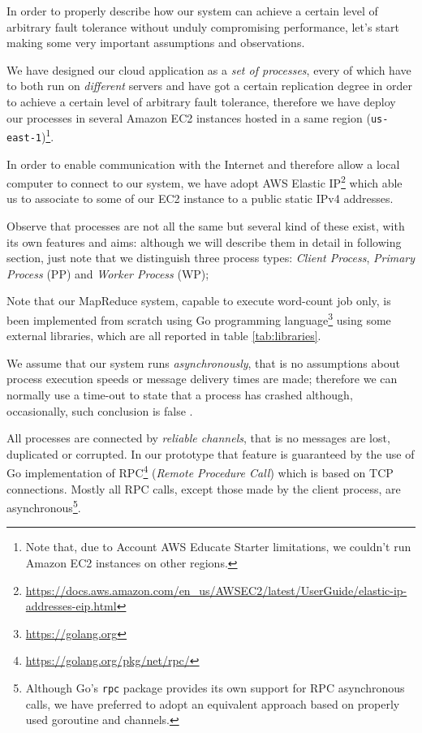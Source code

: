 \documentclass[sigchi]{acmart}
\begin{document}
In order to properly describe how our system can achieve a certain level of arbitrary fault tolerance without unduly compromising performance, let's start making some very important assumptions and observations.

We have designed our cloud application as a \textit{set of processes}, every of which have to both run on \textit{different} servers and have got a certain replication degree in order to achieve a certain level of arbitrary fault tolerance, therefore we have deploy our processes in several Amazon EC2 instances hosted in a same region (\texttt{us-east-1})\footnote{Note that, due to Account AWS Educate Starter limitations, we couldn't run Amazon EC2 instances on other regions.}.

In order to enable communication with the Internet and therefore allow a local computer to connect to our system, we have adopt AWS Elastic IP\footnote{\url{https://docs.aws.amazon.com/en_us/AWSEC2/latest/UserGuide/elastic-ip-addresses-eip.html}} which able us to associate to some of our EC2 instance to a public static IPv4 addresses.

Observe that processes are not all the same but several kind of these exist, with its own features and aims: although we will describe them in detail in following section, just note that we distinguish three process types: \textit{Client Process}, \textit{Primary Process} (PP) and \textit{Worker Process} (WP); 

Note that our MapReduce system, capable to execute word-count job only, is been implemented from scratch using Go programming language\footnote{\url{https://golang.org}} using some external libraries, which are all reported in table \ref{tab:libraries}. 

We assume that our system runs \textit{asynchronously}, that is no assumptions about process execution speeds or message delivery times are made; therefore we can normally use a time-out to state that a process has crashed although, occasionally, such conclusion is false \cite{SDCC}.

All processes are connected by \textit{reliable channels}, that is no messages are lost, duplicated or corrupted. In our prototype that feature is guaranteed  by the use of Go implementation of RPC\footnote{\url{https://golang.org/pkg/net/rpc/}} (\textit{Remote Procedure Call}) which is based on TCP connections. Mostly all RPC calls, except those made by the client process, are asynchronous\footnote{Although Go's \texttt{rpc} package provides its own support for RPC asynchronous calls, we have  preferred to adopt an equivalent approach based on properly used goroutine and channels.}.
\end{document}
